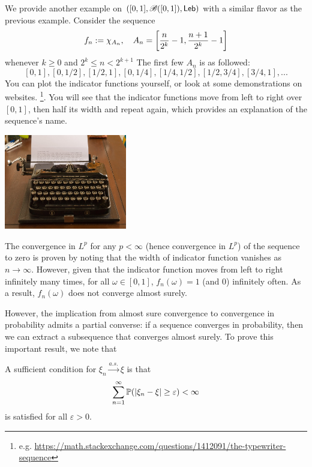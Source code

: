 \begin{example}
We provide another example on $([0,1], \mathcal{B}([0,1]), \mathsf{Leb})$ with a similar flavor as the previous example. Consider the sequence 
\begin{equation}
f_n := \chi_{A_n}, \quad A_n = \left[ \frac{n}{2^k} - 1, \frac{n+1}{2^k} - 1 \right]
\end{equation}
whenever $k \geq 0$ and $2^k \leq n < 2^{k+1}$ The first few $A_n$ is as followed: 
$$[0,1], [0,1/2], [1/2, 1], [0,1/4], [1/4,1/2], [1/2,3/4], [3/4,1], ...$$
You can plot the indicator functions yourself, or look at some demonstrations on websites. \footnote{e.g. \url{https://math.stackexchange.com/questions/1412091/the-typewriter-sequence}}. You will see that the indicator functions move from left to right over $[0,1]$, then half its width and repeat again, which provides an explanation of the sequence's name.

\begin{center}
\includegraphics[width=0.4\textwidth]{figures/typewriter.jpg}
\end{center}

The convergence in $L^p$ for any $p < \infty$ (hence convergence in $L^p$) of the sequence to zero is proven by noting that the width of indicator function vanishes as $n \to \infty$. However, given that the indicator function moves from left to right infinitely many times, for all $\omega \in [0,1]$, $f_n(\omega) = 1$ (and 0) infinitely often. As a result, $f_n(\omega)$ does not converge almost surely.
\end{example}

However, the implication from almost sure convergence to convergence in probability admits a partial converse: if a sequence converges in probability, then we can extract a subsequence that converges almost surely. To prove this important result, we note that 

\begin{lemma} \label{lem:as_conv_sufficient}
A sufficient condition for $\xi_n \xrightarrow{a.s.} \xi$ is that
\begin{equation*}
    \sum_{n=1}^\infty \mathbb{P}(|\xi_n - \xi| \ge \varepsilon) < \infty 
\end{equation*}
is satisfied for all $\varepsilon > 0$.
\end{lemma}

